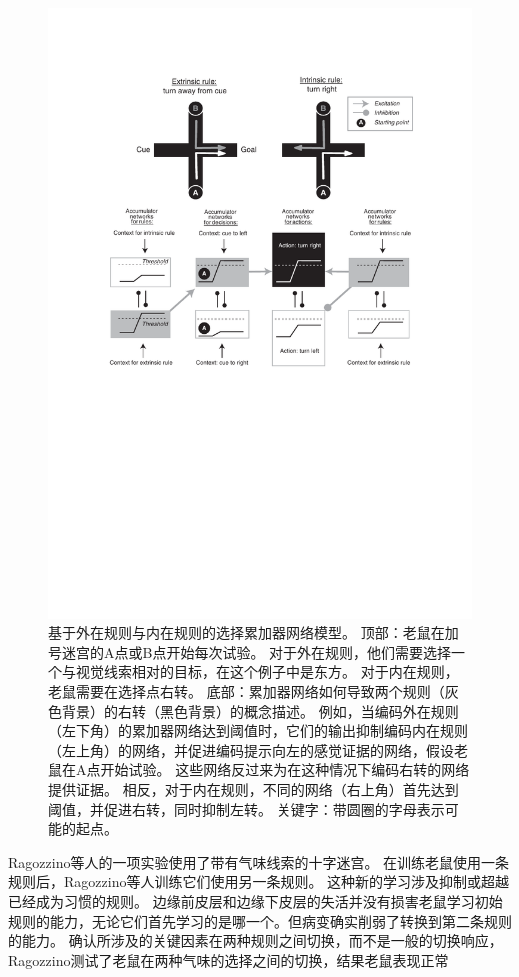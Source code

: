 \begin{figure}[!htb]
	\centering
	\includegraphics{chap3/3_6}
	\caption{基于外在规则与内在规则的选择累加器网络模型。
		顶部：老鼠在加号迷宫的A点或B点开始每次试验。
		对于外在规则，他们需要选择一个与视觉线索相对的目标，在这个例子中是东方。
		对于内在规则，老鼠需要在选择点右转。
		底部：累加器网络如何导致两个规则（灰色背景）的右转（黑色背景）的概念描述。
		例如，当编码外在规则（左下角）的累加器网络达到阈值时，它们的输出抑制编码内在规则（左上角）的网络，并促进编码提示向左的感觉证据的网络，假设老鼠在A点开始试验。
		这些网络反过来为在这种情况下编码右转的网络提供证据。
		相反，对于内在规则，不同的网络（右上角）首先达到阈值，并促进右转，同时抑制左转。
		关键字：带圆圈的字母表示可能的起点。}
	\label{fig:3_6}
\end{figure}


Ragozzino等人\cite{ragozzino1999involvement}的一项实验使用了带有气味线索的十字迷宫。
在训练老鼠使用一条规则后，Ragozzino等人训练它们使用另一条规则。
这种新的学习涉及抑制或超越已经成为习惯的规则。
边缘前皮层和边缘下皮层的失活并没有损害老鼠学习初始规则的能力，无论它们首先学习的是哪一个。但病变确实削弱了转换到第二条规则的能力。
确认所涉及的关键因素在两种规则之间切换，而不是一般的切换响应，Ragozzino\cite{ragozzino2007contribution}测试了老鼠在两种气味的选择之间的切换，结果老鼠表现正常\par


